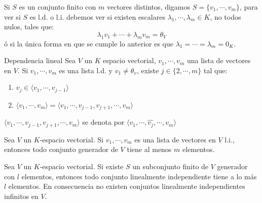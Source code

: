 \begin{obs}{}{}
    Si $S$ es un conjunto finito con $m$ vectores distintos, digamos $S =\{v_1, \cdots, v_m\}$, para ver si $S$ es l.d. o l.i. debemos ver si existen escalares $\lambda_1, \cdots, \lambda_m \in K$, no todos nulos, tales que:
    $$\lambda_1 v_1 + \cdots + \lambda_m v_m = \theta_V$$
    ó si la única forma en que se cumple lo anterior es que $\lambda_1 = \cdots = \lambda_m = 0_K$.
\end{obs}  
\begin{lemma}{Dependencia lineal}
    Sea $V$ un $K$ espacio vectorial, $v_1, \cdots, v_m$ una lista de vectores en $V$. Si $v_1, \cdots, v_m$ es una lista l.d. y $v_1 \neq \theta_v$, existe $j \in \{2, \cdots, m\}$ tal que:
    \begin{enumerate} [label=\alph*)]
        \item $v_j \in \langle v_1, \cdots, v_{j-1} \rangle$
        \item $\langle v_1, \cdots, v_m \rangle = \langle v_1, \cdots, v_{j-1}, v_{j+1}, \cdots, v_m \rangle$
    \end{enumerate}
\end{lemma}
\begin{notation}{}{}
    $\langle v_1, \cdots, v_{j-1}, v_{j+1}, \cdots, v_m \rangle$ se denota por $\langle v_1, \cdots, \hat{v_j}, \cdots, v_m \rangle$
\end{notation}
\begin{theorem}{}{}
    Sea $V$ un $K$-espacio vectorial. Si $v_1, \cdots, v_m$ es una lista de vectores en $V$ l.i., entonces todo conjunto generador de $V$ tiene al menos $m$ elementos.
\end{theorem}
\begin{corollary}{}{}
    Sea $V$ un $K$-espacio vectorial. Si existe $S$ un subconjunto finito de $V$ generador con $l$ elementos, entonces todo conjunto linealmente independiente tiene a lo más $l$ elementos. En consecuencia no existen conjuntos linealmente independientes infinitos en $V$.
\end{corollary}
